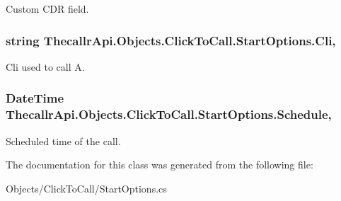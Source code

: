 Custom C\+D\+R field. 

\hypertarget{class_thecallr_api_1_1_objects_1_1_click_to_call_1_1_start_options_a8abb85d77f1a2d566a84518cb1e1a2d3}{
\subsubsection[{Cli}]{\setlength{\rightskip}{0pt plus 5cm}string Thecallr\+Api.\+Objects.\+Click\+To\+Call.\+Start\+Options.\+Cli\hspace{0.3cm}{\ttfamily [get]}, {\ttfamily [set]}}}\label{class_thecallr_api_1_1_objects_1_1_click_to_call_1_1_start_options_a8abb85d77f1a2d566a84518cb1e1a2d3}


Cli used to call A. 

\hypertarget{class_thecallr_api_1_1_objects_1_1_click_to_call_1_1_start_options_a337a4946d6d64829e547063aceb5b7e4}{
\subsubsection[{Schedule}]{\setlength{\rightskip}{0pt plus 5cm}Date\+Time Thecallr\+Api.\+Objects.\+Click\+To\+Call.\+Start\+Options.\+Schedule\hspace{0.3cm}{\ttfamily [get]}, {\ttfamily [set]}}}\label{class_thecallr_api_1_1_objects_1_1_click_to_call_1_1_start_options_a337a4946d6d64829e547063aceb5b7e4}


Scheduled time of the call. 



The documentation for this class was generated from the following file\+:\begin{DoxyCompactItemize}
\item 
Objects/\+Click\+To\+Call/Start\+Options.\+cs\end{DoxyCompactItemize}
